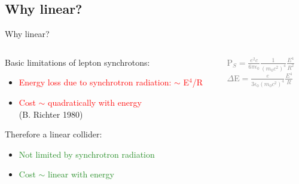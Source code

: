 \documentclass[xcolor={dvipsnames}]{beamer}
\begin{document}
\subsection{Why linear?}
\begin{frame}{Why linear?}
\begin{columns}
 \begin{column}{0.6\textwidth}
  Basic limitations of lepton synchrotons:
\begin{itemize}
 \item \textcolor{Red}{Energy loss due to synchrotron radiation: $\sim$ E$^4$/R}
 \item \textcolor{Red}{Cost $\sim$ quadratically with energy}\\ \tiny{(B. Richter 
1980)}
\end{itemize}
\vspace*{1cm}
Therefore a linear collider:
\begin{itemize}
 \item \textcolor{ForestGreen}{Not limited by synchrotron radiation}
 \item \textcolor{ForestGreen}{Cost $\sim$ linear with energy}
\end{itemize}
 \end{column}
 \begin{column}{0.4\textwidth}
 \begin{block}{}
  \begin{center}
      \textcolor{Gray}{P$_S=\frac{e^2c}{6\pi\epsilon_0}\frac{1}{(m_0c^2)^4}\frac{E^4}{R^2}$\\
  $\Delta$E$=\frac{e}{3\epsilon_0(m_0c^2)^4}\frac{E^4}{R}$}
   \end{center}
 \end{block}
 \end{column}
\end{columns}

\end{frame}


\end{document}
